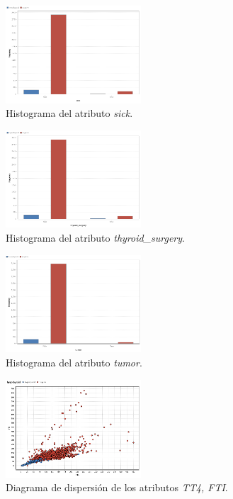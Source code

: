 \documentclass[osajnl,twocolumn,showpacs,superscriptaddress,10pt,floatfix]{revtex4-1} %
\begin{document}
\begin{figure}[H]
    \centering
    \includegraphics[width=0.45\textwidth]{analysis/histogram_sick}
    \caption{Histograma del atributo \textit{sick}.}
    \label{figure:sick}
\end{figure}

\begin{figure}[H]
    \centering
    \includegraphics[width=0.45\textwidth]{analysis/histogram_thyroid_surgery}
    \caption{Histograma del atributo \textit{thyroid\_surgery}.}
    \label{figure:thyroid_surgery}
\end{figure}

\begin{figure}[H]
    \centering
    \includegraphics[width=0.45\textwidth]{analysis/histogram_tumor}
    \caption{Histograma del atributo \textit{tumor}.}
    \label{figure:tumor}
\end{figure}

\begin{figure}[H]
    \centering
    \includegraphics[width=0.45\textwidth]{analysis/scatter_TT4_FTI}
    \caption{Diagrama de dispersión de los atributos \textit{TT4, FTI}.}
    \label{figure:scatter_TT4_FTI}
\end{figure}
\end{document}
